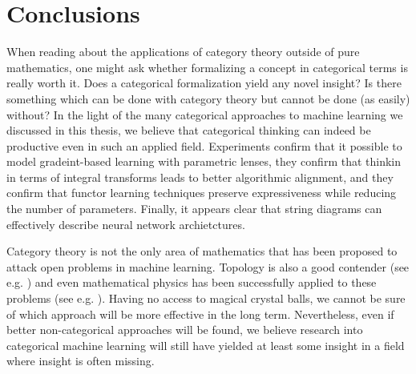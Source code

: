 \documentclass[11pt,a4paper,openright,twoside]{report}
\theoremstyle{plain}
\theoremstyle{definition}
\begin{document}

\chapter*{Conclusions}


When reading about the applications of category theory outside of pure mathematics, one might ask whether formalizing a concept in categorical terms is really worth it. Does a categorical formalization yield any novel insight? Is there something which can be done with category theory but cannot be done (as easily) without? In the light of the many categorical approaches to machine learning we discussed in this thesis, we believe that categorical thinking can indeed be productive even in such an applied field. Experiments confirm that it possible to model gradeint-based learning with parametric lenses, they confirm that thinkin in terms of integral transforms leads to better algorithmic alignment, and they confirm that functor learning techniques preserve expressiveness while reducing the number of parameters. Finally, it appears clear that string diagrams can effectively describe neural network archietctures.  

Category theory is not the only area of mathematics that has been proposed to attack open problems in machine learning. Topology is also a good contender (see e.g. \cite{hensel2021survey}) and even mathematical physics has been successfully applied to these problems (see e.g. \cite{roberts2022principles}). Having no access to magical crystal balls, we cannot be sure of which approach will be more effective in the long term. Nevertheless, even if better non-categorical approaches will be found, we believe research into categorical machine learning will still have yielded at least some insight in a field where insight is often missing. 
\end{document}
